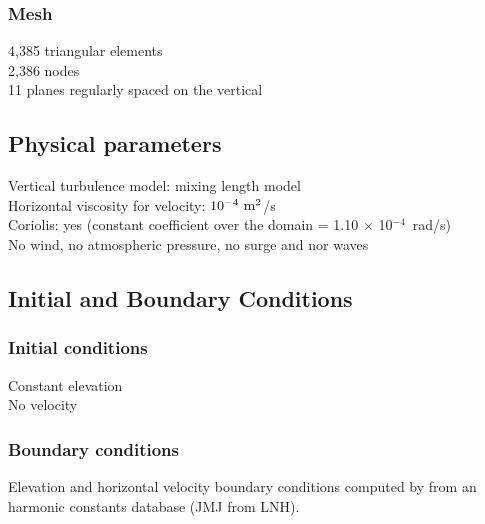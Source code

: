 \subsubsection{Mesh}
%
4,385 triangular elements\\
2,386 nodes\\
11 planes regularly spaced on the vertical
%
%
%
\subsection{Physical parameters}
%
Vertical turbulence model: mixing length model\\
Horizontal viscosity for velocity: $10^{-4}~\rm{m}^2$/s\\
Coriolis: yes (constant coefficient over the domain
= 1.10 $\times$ 10$^{-4}$~rad/s)\\
No wind, no atmospheric pressure, no surge and nor waves
%
%
%
%
%
%
\subsection{Initial and Boundary Conditions}
%
\subsubsection{Initial conditions}
%
Constant elevation\\
No velocity
%
\subsubsection{Boundary conditions}
%
Elevation and horizontal velocity boundary conditions computed by
 from an harmonic constants database (JMJ from LNH).
%
